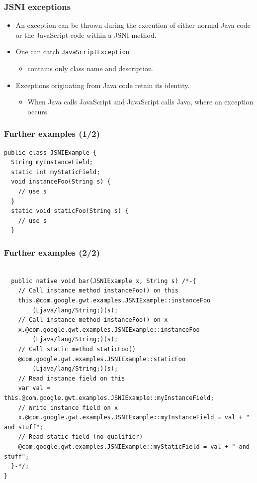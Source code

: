 \documentclass[10pt,table, xcolor=pdflatex]{beamer}
\begin{document}
\begin{frame}\frametitle{JSNI exceptions}
	\begin{itemize}
		\item An exception can be thrown during the execution of either normal Java code or the JavaScript code within a JSNI method.
		\item One can catch \texttt{JavaScriptException}
          \begin{itemize}
        	\item contains only class name and description.
          \end{itemize}
		\item Exceptions originating from Java code retain its identity.
          \begin{itemize}
        	\item When Java calls JavaScript and JavaScript calls Java, where an exception occurs
          \end{itemize}
	\end{itemize}
\end{frame}


\begin{frame}[fragile]\frametitle{Further examples (1/2)}
	\lstset{language=Java, basicstyle=\footnotesize\ttfamily}
	\begin{lstlisting}
public class JSNIExample {
  String myInstanceField;
  static int myStaticField;
  void instanceFoo(String s) {
    // use s
  }
  static void staticFoo(String s) {
    // use s
  }
	\end{lstlisting}
\end{frame}


\begin{frame}[fragile]\frametitle{Further examples (2/2)}
	\lstset{language=Java, basicstyle=\footnotesize\ttfamily}
	\begin{lstlisting}
  
  public native void bar(JSNIExample x, String s) /*-{
    // Call instance method instanceFoo() on this
    this.@com.google.gwt.examples.JSNIExample::instanceFoo
        (Ljava/lang/String;)(s);
    // Call instance method instanceFoo() on x
    x.@com.google.gwt.examples.JSNIExample::instanceFoo
        (Ljava/lang/String;)(s);
    // Call static method staticFoo()
    @com.google.gwt.examples.JSNIExample::staticFoo
        (Ljava/lang/String;)(s);
    // Read instance field on this
    var val = this.@com.google.gwt.examples.JSNIExample::myInstanceField;
    // Write instance field on x
    x.@com.google.gwt.examples.JSNIExample::myInstanceField = val + " and stuff";
    // Read static field (no qualifier)
    @com.google.gwt.examples.JSNIExample::myStaticField = val + " and stuff";
  }-*/;
}
	\end{lstlisting}
\end{frame}
\end{document}

